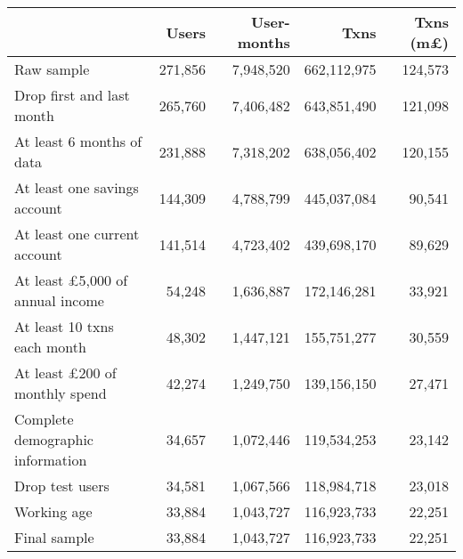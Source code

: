 \begin{tabular}{lrrrr}
\toprule
                                       &   Users & User-months &        Txns & Txns (m\pounds) \\
\midrule
                            Raw sample & 271,856 &   7,948,520 & 662,112,975 &         124,573 \\
             Drop first and last month & 265,760 &   7,406,482 & 643,851,490 &         121,098 \\
             At least 6 months of data & 231,888 &   7,318,202 & 638,056,402 &         120,155 \\
          At least one savings account & 144,309 &   4,788,799 & 445,037,084 &          90,541 \\
          At least one current account & 141,514 &   4,723,402 & 439,698,170 &          89,629 \\
At least \pounds5,000 of annual income &  54,248 &   1,636,887 & 172,146,281 &          33,921 \\
           At least 10 txns each month &  48,302 &   1,447,121 & 155,751,277 &          30,559 \\
  At least \pounds200 of monthly spend &  42,274 &   1,249,750 & 139,156,150 &          27,471 \\
      Complete demographic information &  34,657 &   1,072,446 & 119,534,253 &          23,142 \\
                       Drop test users &  34,581 &   1,067,566 & 118,984,718 &          23,018 \\
                           Working age &  33,884 &   1,043,727 & 116,923,733 &          22,251 \\
                          Final sample &  33,884 &   1,043,727 & 116,923,733 &          22,251 \\
\bottomrule
\end{tabular}
